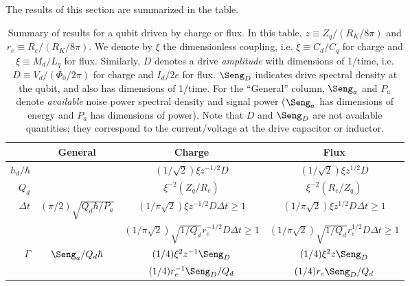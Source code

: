 The results of this section are summarized in the table.
\begin{table*}
  \centering
  \begin{tabular}{|r|c|c|c|}
    \hline
    & General & Charge & Flux \\
    \hline \hline
    $h_d/\hbar$
      &
      & $(1/\sqrt{2}) \xi z^{-1/2} D$
      & $(1/\sqrt{2}) \xi z^{1/2} D$
      \\
    \hline
    $Q_d$
      &
      & $\xi^{-2} (Z_q/R_e)$
      & $\xi^{-2} (R_e/Z_q)$
      \\
    \hline
    $\Delta t$
      & $(\pi/2) \sqrt{Q_d \hbar / P_a}$
      & $(1/\pi\sqrt{2}) \xi z^{-1/2} D \Delta t \geq 1$
      & $(1/\pi\sqrt{2}) \xi z^{1/2}  D \Delta t \geq 1$
      \\
      &
      & $(1/\pi\sqrt{2}) \sqrt{1/Q_d} r_e^{-1/2} D \Delta t \geq 1$
      & $(1/\pi\sqrt{2}) \sqrt{1/Q_d} r_e^{1/2}  D \Delta t \geq 1$
      \\
    \hline
    $\Gamma$
      & $\Seng_a / Q_d \hbar$
      & $(1/4) \xi^2 z^{-1} \Seng_D$
      & $(1/4) \xi^2 z      \Seng_D$
      \\
      &
      & $(1/4) r_e^{-1} \Seng_D / Q_d$
      & $(1/4) r_e      \Seng_D / Q_d$
      \\
    \hline
  \end{tabular}
  \caption{Summary of results for a qubit driven by charge or flux. In this table, $z\equiv Z_q/(R_K/8\pi)$ and $r_e \equiv R_e / (R_K/8\pi)$. We denote by $\xi$ the dimensionless coupling, i.e. $\xi \equiv C_d/C_q$ for charge and $\xi \equiv M_d/L_q$ for flux. Similarly, $D$ denotes a drive \emph{amplitude} with dimensions of 1/time, i.e. $D \equiv V_d/(\Phi_0 / 2\pi)$ for charge and $I_d/2e$ for flux. $\Seng_D$ indicates drive spectral density at the qubit, and also has dimensions of 1/time. For the ``General'' column, $\Seng_a$ and $P_a$ denote \emph{available} noise power spectral density and signal power ($\Seng_a$ has dimensions of energy and $P_a$ has dimensions of power). Note that $D$ and $\Seng_D$ are not available quantities; they correspond to the current/voltage at the drive capacitor or inductor.}
\end{table*}
